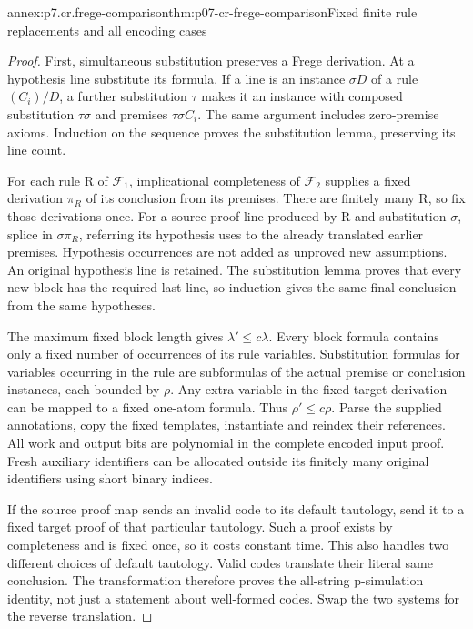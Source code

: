 \begin{annexitem}{annex:p7.cr.frege-comparison}{thm:p07-cr-frege-comparison}{Fixed finite rule replacements and all encoding cases}
\begin{proof}
First, simultaneous substitution preserves a Frege derivation.
At a hypothesis line substitute its formula. If a line is an
instance \(\sigma D\) of a rule \((C_i)/D\), a further
substitution \(\tau\) makes it an instance with composed
substitution \(\tau\sigma\) and premises \(\tau\sigma C_i\).
The same argument includes zero-premise axioms. Induction on
the sequence proves the substitution lemma, preserving its line count.

For each rule R of \(\mathcal F_1\), implicational completeness
of \(\mathcal F_2\) supplies a fixed derivation \(\pi_R\)
of its conclusion from its premises. There are finitely many R,
so fix those derivations once. For a source proof line produced
by R and substitution \(\sigma\), splice in \(\sigma\pi_R\),
referring its hypothesis uses to the already translated earlier
premises. Hypothesis occurrences are not added as unproved new
assumptions. An original hypothesis line is retained. The substitution
lemma proves that every new block has the required last line,
so induction gives the same final conclusion from the same hypotheses.

The maximum fixed block length gives \(\lambda'\leq c\lambda\).
Every block formula contains only a fixed number of occurrences
of its rule variables. Substitution formulas for variables occurring
in the rule are subformulas of the actual premise or conclusion
instances, each bounded by \(\rho\). Any extra variable in the
fixed target derivation can be mapped to a fixed one-atom formula.
Thus \(\rho'\leq c\rho\). Parse the supplied annotations,
copy the fixed templates, instantiate and reindex their references.
All work and output bits are polynomial in the complete encoded
input proof. Fresh auxiliary identifiers can be allocated outside
its finitely many original identifiers using short binary indices.

If the source proof map sends an invalid code to its default
tautology, send it to a fixed target proof of that particular
tautology. Such a proof exists by completeness and is fixed once,
so it costs constant time. This also handles two different choices
of default tautology. Valid codes translate their literal same
conclusion. The transformation therefore proves the all-string
p-simulation identity, not just a statement about well-formed codes.
Swap the two systems for the reverse translation.
\end{proof}
\end{annexitem}

